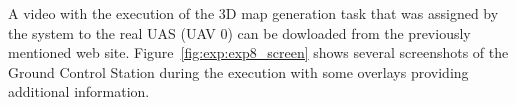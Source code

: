 \documentclass[twocolumn]{svjour3}          %
\begin{document}
A video with the execution of the 3D map generation task that was assigned by the system to the real UAS (UAV 0) can be dowloaded from the previously mentioned web site. Figure~\ref{fig:exp:exp8_screen} shows several screenshots of the Ground Control Station during the execution with some overlays providing additional information.

\begin{figure}[htbp!]
    \centering
	  
\end{figure}
\end{document}
